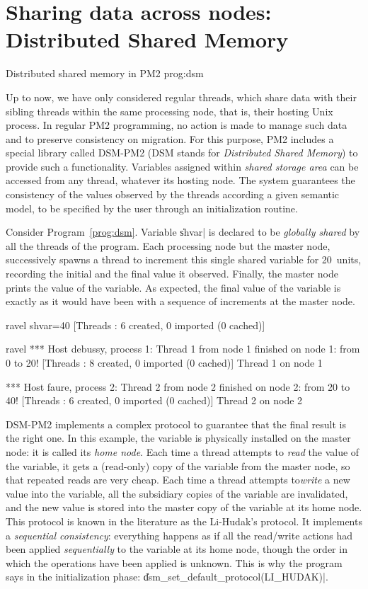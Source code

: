 \section{Sharing data across nodes: Distributed Shared Memory}

 {Distributed shared memory in PM2}
{prog:dsm}

Up to now, we have only considered regular threads, which share data
with their sibling threads within the same processing node, that is,
their hosting Unix process. In regular PM2 programming, no action is
made to manage such data and to preserve consistency on migration.
For this purpose, PM2 includes a special library called DSM-PM2 (DSM
stands for \emph{Distributed Shared Memory}) to provide such a
functionality. Variables assigned within \emph{shared storage area}
can be accessed from any thread, whatever its hosting node. The system
guarantees the consistency of the values observed by the threads
according a given semantic model, to be specified by the user through
an initialization routine. 

Consider Program~\ref{prog:dsm}. Variable \|shvar| is declared to be
\emph{globally shared} by all the threads of the program.  Each
processing node but the master node, successively spawns a thread to
increment this single shared variable for 20~units, recording the
initial and the final value it observed.  Finally, the master node
prints the value of the variable.  As expected, the final value of the
variable is exactly as it would have been with a sequence of
increments at the master node.
\begin{shell}
ravel%
shvar=40
[Threads : 6 created, 0 imported (0 cached)]

ravel%
*** Host debussy, process 1:
Thread 1 from node 1 finished on node 1: from 0 to 20!
[Threads : 8 created, 0 imported (0 cached)]
Thread 1 on node 1

*** Host faure, process 2:
Thread 2 from node 2 finished on node 2: from 20 to 40!
[Threads : 6 created, 0 imported (0 cached)]
Thread 2 on node 2
\end{shell}

DSM-PM2 implements a complex protocol to guarantee that the final
result is the right one. In this example, the variable is physically
installed on the master node: it is called its \emph{home node}. Each
time a thread attempts to \emph{read} the value of the variable, it
gets a (read-only) copy of the variable from the master node, so that
repeated reads are very cheap. Each time a thread attempts
to\emph{write} a new value into the variable, all the subsidiary
copies of the variable are invalidated, and the new value is stored
into the master copy of the variable at its home node. This protocol
is known in the literature as the Li-Hudak's protocol. It implements a
\emph{sequential consistency}: everything happens as if all the
read/write actions had been applied \emph{sequentially} to the
variable at its home node, though the order in which the operations
have been applied is unknown. This is why the program says in the
initialization phase: \|dsm_set_default_protocol(LI_HUDAK)|.

